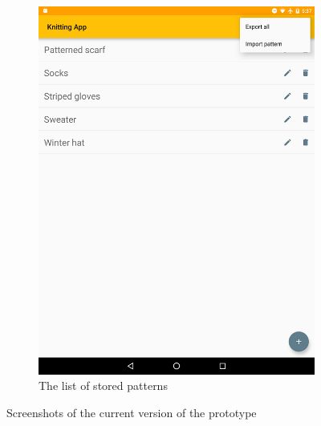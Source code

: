 \begin{figure}[H]
\begin{subfigure}[b]{0.5\textwidth}
	    \includegraphics[width=0.95\linewidth]{images/pattern_list_open_menu_h900.png}
	    \caption[The list of stored patterns \protect{}]{The list of stored patterns}
	  \label{fig:patternlist}
	\end{subfigure}
	\caption{Screenshots of the current version of the prototype}
\end{figure}
